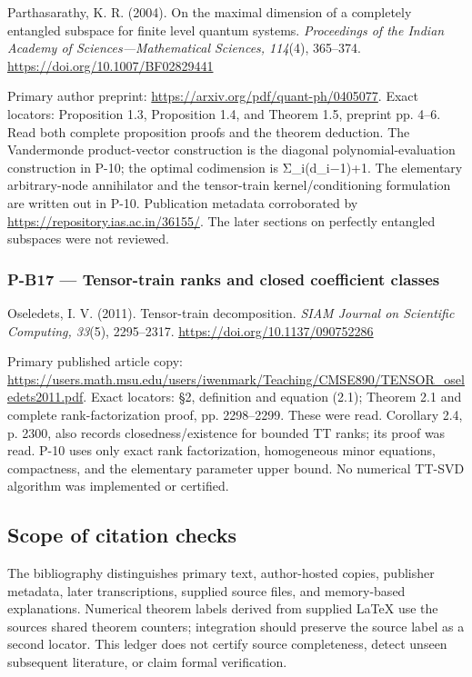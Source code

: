 \documentclass[11pt,a4paper]{article}
\theoremstyle{definition}\newtheorem{definition}{Definition}
\begin{document}
Parthasarathy, K. R. (2004). On the maximal dimension of a completely
entangled subspace for finite level quantum systems. \emph{Proceedings
of the Indian Academy of Sciences---Mathematical Sciences, 114}(4),
365--374. \url{https://doi.org/10.1007/BF02829441}

Primary author preprint: \url{https://arxiv.org/pdf/quant-ph/0405077}.
Exact locators: Proposition 1.3, Proposition 1.4, and Theorem 1.5,
preprint pp. 4--6. Read both complete proposition proofs and the theorem
deduction. The Vandermonde product-vector construction is the diagonal
polynomial-evaluation construction in P-10; the optimal codimension is
Σ\_i(d\_i−1)+1. The elementary arbitrary-node annihilator and the
tensor-train kernel/conditioning formulation are written out in P-10.
Publication metadata corroborated by
\url{https://repository.ias.ac.in/36155/}. The later sections on
perfectly entangled subspaces were not reviewed.

\subsubsection{P-B17 --- Tensor-train ranks and closed coefficient
classes}\label{p-b17--tensor-train-ranks-and-closed-coefficient-classes}

Oseledets, I. V. (2011). Tensor-train decomposition. \emph{SIAM Journal
on Scientific Computing, 33}(5), 2295--2317.
\url{https://doi.org/10.1137/090752286}

Primary published article copy:
\url{https://users.math.msu.edu/users/iwenmark/Teaching/CMSE890/TENSOR_oseledets2011.pdf}.
Exact locators: §2, definition and equation (2.1); Theorem 2.1 and
complete rank-factorization proof, pp. 2298--2299. These were read.
Corollary 2.4, p. 2300, also records closedness/existence for bounded TT
ranks; its proof was read. P-10 uses only exact rank factorization,
homogeneous minor equations, compactness, and the elementary parameter
upper bound. No numerical TT-SVD algorithm was implemented or certified.

\subsection{Scope of citation checks}\label{scope-of-citation-checks}

The bibliography distinguishes primary text, author-hosted copies,
publisher metadata, later transcriptions, supplied source files, and
memory-based explanations. Numerical theorem labels derived from
supplied LaTeX use the source\textquotesingle s shared theorem counters;
integration should preserve the source label as a second locator. This
ledger does not certify source completeness, detect unseen subsequent
literature, or claim formal verification.
\end{document}
